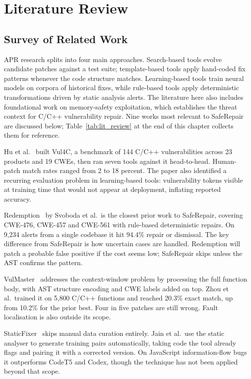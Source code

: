\chapter{Literature Review}
\label{chap:literature_review}

\section{Survey of Related Work}

APR research splits into four main approaches. Search-based tools evolve candidate patches against a test suite; template-based tools apply hand-coded fix patterns whenever the code structure matches. Learning-based tools train neural models on corpora of historical fixes, while rule-based tools apply deterministic transformations driven by static analysis alerts. The literature here also includes foundational work on memory-safety exploitation, which establishes the threat context for C/C++ vulnerability repair. Nine works most relevant to SafeRepair are discussed below; Table~\ref{tab:lit_review} at the end of this chapter collects them for reference.

Hu et al.~\cite{b1} built Vul4C, a benchmark of 144 C/C++ vulnerabilities across 23 products and 19 CWEs, then ran seven tools against it head-to-head. Human-patch match rates ranged from 2 to 18 percent. The paper also identified a recurring evaluation problem in learning-based tools: vulnerability tokens visible at training time that would not appear at deployment, inflating reported accuracy.

Redemption~\cite{b2} by Svoboda et al.\ is the closest prior work to SafeRepair, covering CWE-476, CWE-457 and CWE-561 with rule-based deterministic repairs. On 9,234 alerts from a single codebase it hit 94.4\% repair or dismissal. The key difference from SafeRepair is how uncertain cases are handled. Redemption will patch a probable false positive if the cost seems low; SafeRepair skips unless the AST confirms the pattern.

VulMaster~\cite{b3} addresses the context-window problem by processing the full function body, with AST structure encoding and CWE labels added on top. Zhou et al.\ trained it on 5,800 C/C++ functions and reached 20.3\% exact match, up from 10.2\% for the prior best. Four in five patches are still wrong. Fault localisation is also outside its scope.

StaticFixer~\cite{b5} skips manual data curation entirely. Jain et al.\ use the static analyser to generate training pairs automatically, taking code the tool already flags and pairing it with a corrected version. On JavaScript information-flow bugs it outperforms CodeT5 and Codex, though the technique has not been applied beyond that scope.

